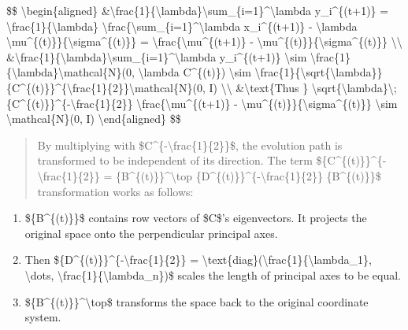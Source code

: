 \$\$ \textbackslash begin\{aligned\} \&\textbackslash frac\{1\}\{\textbackslash lambda\}\textbackslash sum\_\{i=1\}\^{}\textbackslash lambda y\_i\^{}\{(t+1)\} = \textbackslash frac\{1\}\{\textbackslash lambda\} \textbackslash frac\{\textbackslash sum\_\{i=1\}\^{}\textbackslash lambda x\_i\^{}\{(t+1)\} - \textbackslash lambda \textbackslash mu\^{}\{(t)\}\}\{\textbackslash sigma\^{}\{(t)\}\} = \textbackslash frac\{\textbackslash mu\^{}\{(t+1)\} - \textbackslash mu\^{}\{(t)\}\}\{\textbackslash sigma\^{}\{(t)\}\} \textbackslash\textbackslash{} \&\textbackslash frac\{1\}\{\textbackslash lambda\}\textbackslash sum\_\{i=1\}\^{}\textbackslash lambda y\_i\^{}\{(t+1)\} \textbackslash sim \textbackslash frac\{1\}\{\textbackslash lambda\}\textbackslash mathcal\{N\}(0, \textbackslash lambda C\^{}\{(t)\}) \textbackslash sim \textbackslash frac\{1\}\{\textbackslash sqrt\{\textbackslash lambda\}\}\{C\^{}\{(t)\}\}\^{}\{\textbackslash frac\{1\}\{2\}\}\textbackslash mathcal\{N\}(0, I) \textbackslash\textbackslash{} \&\textbackslash text\{Thus \} \textbackslash sqrt\{\textbackslash lambda\}\textbackslash;\{C\^{}\{(t)\}\}\^{}\{-\textbackslash frac\{1\}\{2\}\} \textbackslash frac\{\textbackslash mu\^{}\{(t+1)\} - \textbackslash mu\^{}\{(t)\}\}\{\textbackslash sigma\^{}\{(t)\}\} \textbackslash sim \textbackslash mathcal\{N\}(0, I) \textbackslash end\{aligned\} \$\$

\begin{quote}
By multiplying with \$C\^{}\{-\textbackslash frac\{1\}\{2\}\}\$, the evolution path is transformed to be independent of its direction. The term \$\{C\^{}\{(t)\}\}\^{}\{-\textbackslash frac\{1\}\{2\}\} = \{B\^{}\{(t)\}\}\^{}\textbackslash top \{D\^{}\{(t)\}\}\^{}\{-\textbackslash frac\{1\}\{2\}\} \{B\^{}\{(t)\}\}\$ transformation works as follows:
\end{quote}

\begin{enumerate}
\tightlist
\item
  \$\{B\^{}\{(t)\}\}\$ contains row vectors of \$C\$'s eigenvectors. It projects the original space onto the perpendicular principal axes.
\item
  Then \$\{D\^{}\{(t)\}\}\^{}\{-\textbackslash frac\{1\}\{2\}\} = \textbackslash text\{diag\}(\textbackslash frac\{1\}\{\textbackslash lambda\_1\}, \textbackslash dots, \textbackslash frac\{1\}\{\textbackslash lambda\_n\})\$ scales the length of principal axes to be equal.
\item
  \$\{B\^{}\{(t)\}\}\^{}\textbackslash top\$ transforms the space back to the original coordinate system.
\end{enumerate}

